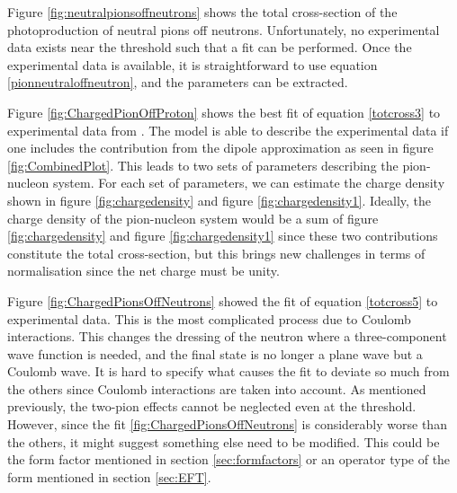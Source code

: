 Figure \ref{fig:neutralpionsoffneutrons} shows the total cross-section of the photoproduction of neutral pions off neutrons. Unfortunately, no experimental data exists near the threshold such that a fit can be performed. Once the experimental data is available, it is straightforward to use equation \eqref{pionneutraloffneutron}, and the parameters can be extracted. 

Figure \ref{fig:ChargedPionOffProton} shows the best fit of equation \eqref{totcross3} to experimental data from \cite{PionOffNeutron}. The model is able to describe the experimental data if one includes the contribution from the dipole approximation as seen in figure \ref{fig:CombinedPlot}. This leads to two sets of parameters describing the pion-nucleon system. For each set of parameters, we can estimate the charge density shown in figure \ref{fig:chargedensity} and figure \ref{fig:chargedensity1}. Ideally, the charge density of the pion-nucleon system would be a sum of figure \ref{fig:chargedensity} and figure \ref{fig:chargedensity1} since these two contributions constitute the total cross-section, but this brings new challenges in terms of normalisation since the net charge must be unity. 

Figure \ref{fig:ChargedPionsOffNeutrons} showed the fit of equation \eqref{totcross5} to experimental data. This is the most complicated process due to Coulomb interactions. This changes the dressing of the neutron where a three-component wave function is needed, and the final state is no longer a plane wave but a Coulomb wave. It is hard to specify what causes the fit to deviate so much from the others since Coulomb interactions are taken into account. As mentioned previously, the two-pion effects cannot be neglected even at the threshold. However, since the fit \ref{fig:ChargedPionsOffNeutrons} is considerably worse than the others, it might suggest something else need to be modified. This could be the form factor mentioned in section \ref{sec:formfactors} or an operator type of the form mentioned in section \ref{sec:EFT}.

\clearpage
\thispagestyle{empty}\mbox{}
\clearpage
